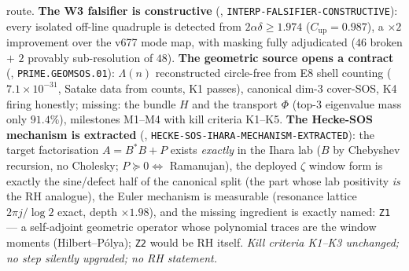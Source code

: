 route.  \textbf{The W3 falsifier is constructive}
(,
\texttt{INTERP-FALSIFIER-CONSTRUCTIVE}): every isolated off-line
quadruple is detected from $2\alpha\delta\ge1.974$
($C_{\mathrm{up}}=0.987$), a $\times2$ improvement over the v677 mode
map, with masking fully adjudicated ($46$ broken $+$ $2$ provably
sub-resolution of $48$).  \textbf{The geometric source opens a
contract} (,
\texttt{PRIME.GEOMSOS.01}): $\Lambda(n)$ reconstructed circle-free
from E8 shell counting ($7.1\times10^{-31}$, Satake data from counts,
K1 passes), canonical dim-3 cover-SOS, K4 firing honestly; missing:
the bundle $H$ and the transport $\Phi$ (top-3 eigenvalue mass only
$91.4\%$), milestones M1--M4 with kill criteria K1--K5.  \textbf{The
Hecke-SOS mechanism is extracted} (,
\texttt{HECKE-SOS-IHARA-MECHANISM-EXTRACTED}): the target
factorisation $A=B^*B+P$ exists \emph{exactly} in the Ihara lab ($B$
by Chebyshev recursion, no Cholesky; $P\succeq0\iff$ Ramanujan), the
deployed $\zeta$ window form is exactly the sine/defect half of the
canonical split (the part whose lab positivity \emph{is} the RH
analogue), the Euler mechanism is measurable (resonance lattice
$2\pi j/\log2$ exact, depth $\times1.98$), and the missing ingredient
is exactly named: \texttt{Z1} --- a self-adjoint geometric operator
whose polynomial traces are the window moments (Hilbert--P\'olya);
\texttt{Z2} would be RH itself.  \emph{Kill criteria K1--K3
unchanged; no step silently upgraded; no RH statement.}


